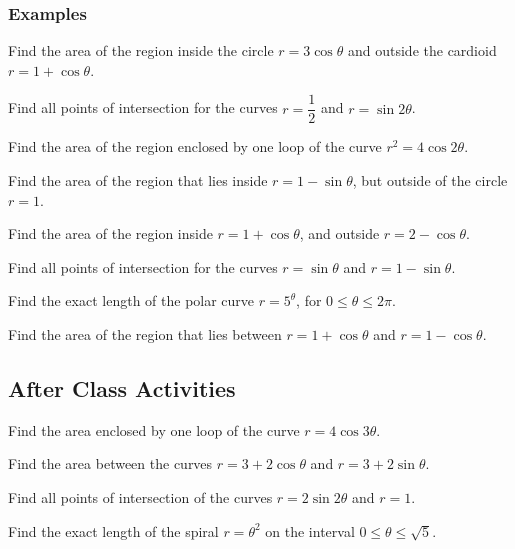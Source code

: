 \documentclass[notes]{subfiles}
\begin{document}
	\subsubsection*{Examples}
		\begin{ex}
			Find the area of the region inside the circle $r = 3\cos\theta$ and outside the cardioid $r = 1+ \cos\theta$.
		\end{ex}
			
		\begin{ex}
			Find all points of intersection for the curves $r = \dfrac{1}{2}$ and $r =\sin 2\theta$.
		\end{ex}
			\newpage
			
		\begin{ex}
			Find the area of the region enclosed by one loop of the curve $r^2 = 4\cos 2\theta$.
		\end{ex}
		
		\begin{ex}
			Find the area of the region that lies inside $r = 1-\sin\theta$, but outside of the circle $r = 1$.
		\end{ex}
			
		\begin{ex}
			Find the area of the region inside $r = 1+\cos\theta$, and outside $r = 2-\cos\theta$.
		\end{ex}
			\newpage
			
		\begin{ex}
			Find all points of intersection for the curves $r = \sin\theta$ and $r = 1-\sin\theta$.
		\end{ex}
			
		\begin{ex}
			Find the exact length of the polar curve $r = 5^\theta$, for $0\leq \theta \leq 2\pi$.
		\end{ex}
			
		\begin{ex}
			Find the area of the region that lies between $r = 1+\cos\theta$ and $r = 1-\cos\theta$.
		\end{ex}
			\newpage
			
	\subsection*{After Class Activities}
		\begin{ex}
			Find the area enclosed by one loop of the curve $r = 4\cos 3\theta$.
		\end{ex}
			
		\begin{ex}
			Find the area between the curves $r = 3 +2\cos\theta$ and $r = 3 +2\sin\theta$.
		\end{ex}
			\newpage
			
		\begin{ex}
			Find all points of intersection of the curves $r = 2\sin2\theta$ and $r = 1$.
		\end{ex}
			
		\begin{ex}
			Find the exact length of the spiral $r = \theta^2$ on the interval $0\leq\theta\leq \sqrt{5}$.
		\end{ex}
\clearpage
\end{document}
